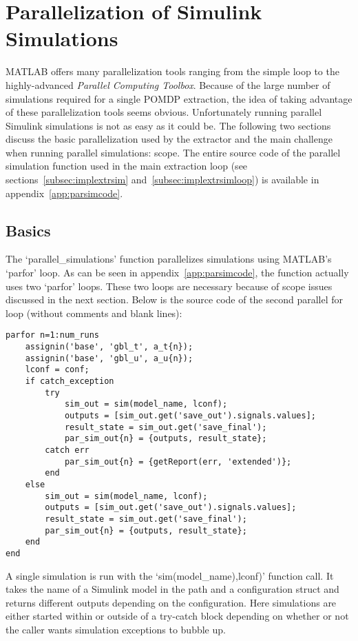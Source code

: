 \section{Parallelization of Simulink Simulations}
\label{app:parallel}

MATLAB offers many parallelization tools ranging from the simple  loop to the highly-advanced \textit{Parallel Computing Toolbox}. Because of the large number of simulations required for a single POMDP extraction, the idea of taking advantage of these parallelization tools seems obvious. Unfortunately running parallel Simulink simulations is not as easy as it could be. The following two sections discuss the basic parallelization used by the extractor and the main challenge when running parallel simulations: scope. The entire source code of the parallel simulation function used in the main extraction loop (see sections~\ref{subsec:implextrsim} and~\ref{subsec:implextrsimloop}) is available in appendix~\ref{app:parsimcode}.

\subsection{Basics}

The `parallel\_simulations' function parallelizes simulations using MATLAB's `parfor' loop. As can be seen in appendix~\ref{app:parsimcode}, the function actually uses two `parfor' loops. These two loops are necessary because of scope issues discussed in the next section. Below is the source code of the second parallel for loop (without comments and blank lines):

\begin{lstlisting}
parfor n=1:num_runs
    assignin('base', 'gbl_t', a_t{n});
    assignin('base', 'gbl_u', a_u{n});
    lconf = conf;
    if catch_exception
        try
            sim_out = sim(model_name, lconf);
            outputs = [sim_out.get('save_out').signals.values];
            result_state = sim_out.get('save_final');            
            par_sim_out{n} = {outputs, result_state};
        catch err
            par_sim_out{n} = {getReport(err, 'extended')};
        end
    else
        sim_out = sim(model_name, lconf);
        outputs = [sim_out.get('save_out').signals.values];
        result_state = sim_out.get('save_final');
        par_sim_out{n} = {outputs, result_state};
    end
end
\end{lstlisting}

A single simulation is run with the `sim(model\_name),lconf)' function call. It takes the name of a Simulink model in the path and a configuration struct and returns different outputs depending on the configuration. Here simulations are either started within or outside of a try-catch block depending on whether or not the caller wants simulation exceptions to bubble up.

